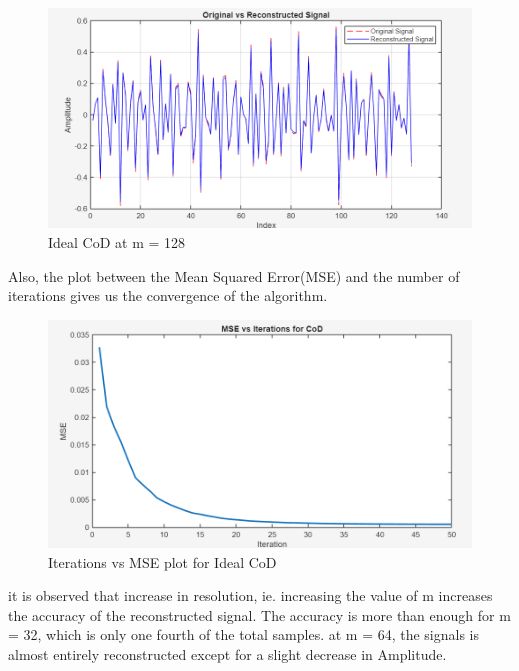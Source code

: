 \documentclass[
  letterpaper,
  DIV=11,
  numbers=noendperiod]{scrartcl}
\begin{document}
\begin{figure}[H]

{\centering \includegraphics[width=0.8\linewidth,height=\textheight,keepaspectratio]{abar-cs_files/mediabag/cod_m128.png}

}

\caption{Ideal CoD at m = 128}

\end{figure}%

Also, the plot between the Mean Squared Error(MSE) and the number of
iterations gives us the convergence of the algorithm.

\begin{figure}[H]

{\centering \includegraphics[width=0.8\linewidth,height=\textheight,keepaspectratio]{abar-cs_files/mediabag/cod_conv_ideal.png}

}

\caption{Iterations vs MSE plot for Ideal CoD}

\end{figure}%

it is observed that increase in resolution, ie. increasing the value of
m increases the accuracy of the reconstructed signal. The accuracy is
more than enough for m = 32, which is only one fourth of the total
samples. at m = 64, the signals is almost entirely reconstructed except
for a slight decrease in Amplitude.
\end{document}
